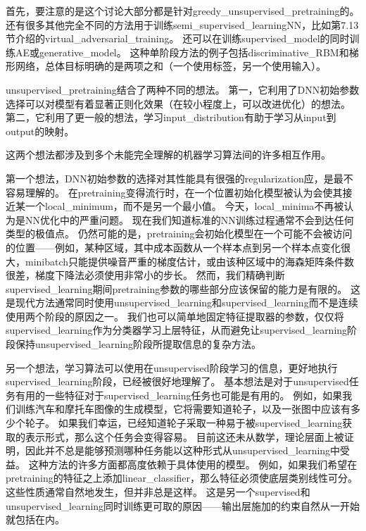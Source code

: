 
首先，要注意的是这个讨论大部分都是针对\gls{greedy_unsupervised_pretraining}的。
还有很多其他完全不同的方法用于训练\gls{semi_supervised_learning}\gls{NN}，比如第7.13节介绍的\gls{virtual_adversarial_training}。
还可以在训练\gls{supervised_model}的同时训练\gls{AE}或\gls{generative_model}。
这种单阶段方法的例子包括\gls{discriminative_RBM}\citep{Larochelle+Bengio-2008}和梯形网络\citep{Rasmus-et-al-arxiv2015}，总体目标明确的是两项之和（一个使用标签，另一个使用输入）。


\gls{unsupervised_pretraining}结合了两种不同的想法。
第一，它利用了\gls{DNN}初始参数选择可以对模型有着显著正则化效果（在较小程度上，可以改进优化）的想法。
第二，它利用了更一般的想法，学习\gls{input_distribution}有助于学习从\gls{input}到\gls{output}的映射。


这两个想法都涉及到多个未能完全理解的机器学习算法间的许多相互作用。


第一个想法，\gls{DNN}初始参数的选择对其性能具有很强的\gls{regularization}应，是最不容易理解的。
在\gls{pretraining}变得流行时，在一个位置初始化模型被认为会使其接近某一个\gls{local_minimum}，而不是另一个最小值。
今天，\gls{local_minima}不再被认为是\gls{NN}优化中的严重问题。
现在我们知道标准的\gls{NN}训练过程通常不会到达任何类型的极值点。
仍然可能的是，\gls{pretraining}会初始化模型在一个可能不会被访问的位置——例如，某种区域，其中成本函数从一个样本点到另一个样本点变化很大，\gls{minibatch}只能提供噪音严重的梯度估计，或由该种区域中的海森矩阵条件数很差，梯度下降法必须使用非常小的步长。
然而，我们精确判断\gls{supervised_learning}期间\gls{pretraining}参数的哪些部分应该保留的能力是有限的。
这是现代方法通常同时使用\gls{unsupervised_learning}和\gls{supervised_learning}而不是连续使用两个阶段的原因之一。
我们也可以简单地固定特征提取器的参数，仅仅将\gls{supervised_learning}作为分类器学习上层特征，从而避免让\gls{supervised_learning}阶段保持\gls{unsupervised_learning}阶段所提取信息的复杂方法。


另一个想法，学习算法可以使用在\gls{unsupervised}阶段学习的信息，更好地执行\gls{supervised_learning}阶段，已经被很好地理解了。
基本想法是对于\gls{unsupervised}任务有用的一些特征对于\gls{supervised_learning}任务也可能是有用的。
例如，如果我们训练汽车和摩托车图像的生成模型，它将需要知道轮子，以及一张图中应该有多少个轮子。
如果我们幸运，已经知道轮子采取一种易于被\gls{supervised_learning}获取的表示形式，那么这个任务会变得容易。
目前这还未从数学，理论层面上被证明，因此并不总是能够预测哪种任务能以这种形式从\gls{unsupervised_learning}中受益。
这种方法的许多方面都高度依赖于具体使用的模型。
例如，如果我们希望在\gls{pretraining}的特征之上添加\gls{linear_classifier}，那么特征必须使底层类别线性可分。
这些性质通常自然地发生，但并非总是这样。
这是另一个\gls{supervised}和\gls{unsupervised_learning}同时训练更可取的原因——输出层施加的约束自然从一开始就包括在内。


